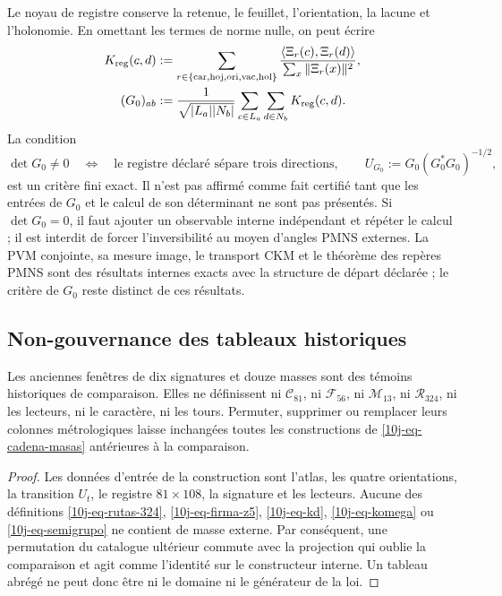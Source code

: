 Le noyau de registre conserve la retenue, le feuillet, l'orientation, la lacune et l'holonomie. En omettant les termes de norme nulle, on peut écrire
\begin{equation}
 \begin{aligned}
 K_{\rm reg}(c,d)&:=
 \sum_{r\in\{\mathrm{car},\mathrm{hoj},\mathrm{ori},\mathrm{vac},\mathrm{hol}\}}
 \frac{\langle\Xi_r(c),\Xi_r(d)\rangle}{\sum_x\|\Xi_r(x)\|^2},\\
 (G_0)_{ab}&:=\frac1{\sqrt{|L_a||N_b|}}
 \sum_{c\in L_a}\sum_{d\in N_b}K_{\rm reg}(c,d).
 \end{aligned}
 \label{10j-eq-pmns-kernel-completo}
\end{equation}
La condition
\begin{equation}
 \det G_0\ne0
 \quad\Longleftrightarrow\quad
 \text{le registre déclaré sépare trois directions},
 \qquad
 U_{G_0}:=G_0(G_0^*G_0)^{-1/2},
 \label{10j-eq-pmns-criterio-rango}
\end{equation}
est un critère fini exact. Il n'est pas affirmé comme fait certifié tant que les entrées de \(G_0\) et le calcul de son déterminant ne sont pas présentés. Si \(\det G_0=0\), il faut ajouter un observable interne indépendant et répéter le calcul ; il est interdit de forcer l'inversibilité au moyen d'angles PMNS externes. La PVM conjointe, sa mesure image, le transport CKM et le théorème des repères PMNS sont des résultats internes exacts avec la structure de départ déclarée ; le critère de \(G_0\) reste distinct de ces résultats.

\subsection{Non-gouvernance des tableaux historiques}

\begin{proposition}
\label{10j-prop-tablas-historicas}
Les anciennes fenêtres de dix signatures et douze masses sont des témoins historiques de comparaison. Elles ne définissent ni \(\mathcal C_{81}\), ni \(\mathcal F_{56}\), ni \(\mathcal M_{13}\), ni \(\mathcal R_{324}\), ni les lecteurs, ni le caractère, ni les tours. Permuter, supprimer ou remplacer leurs colonnes métrologiques laisse inchangées toutes les constructions de \eqref{10j-eq-cadena-masas} antérieures à la comparaison.
\end{proposition}

\begin{proof}
Les données d'entrée de la construction sont l'atlas, les quatre orientations, la transition \(U_t\), le registre \(81\times108\), la signature et les lecteurs. Aucune des définitions \eqref{10j-eq-rutas-324}, \eqref{10j-eq-firma-z5}, \eqref{10j-eq-kd}, \eqref{10j-eq-komega} ou \eqref{10j-eq-semigrupo} ne contient de masse externe. Par conséquent, une permutation du catalogue ultérieur commute avec la projection qui oublie la comparaison et agit comme l'identité sur le constructeur interne. Un tableau abrégé ne peut donc être ni le domaine ni le générateur de la loi.
\end{proof}

